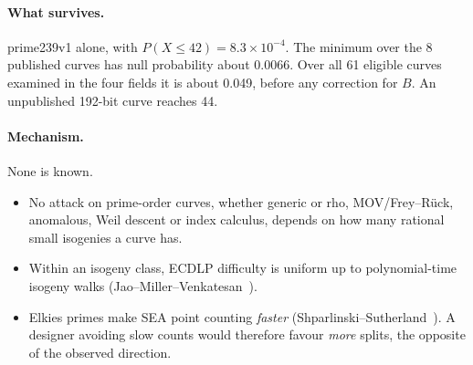 \documentclass[11pt,a4paper]{article}
\theoremstyle{plain}
\begin{document}
\paragraph{What survives.} prime239v1 alone, with
$P(X \le 42) = 8.3 \times 10^{-4}$. The minimum over the 8 published curves
has null probability about 0.0066. Over all 61 eligible curves examined in the
four fields it is about 0.049, before any correction for $B$. An unpublished
192-bit curve reaches 44.

\paragraph{Mechanism.} None is known.
\begin{itemize}
\item No attack on prime-order curves, whether generic or rho, MOV/Frey--R\"uck,
  anomalous, Weil descent or index calculus, depends on how many rational small
  isogenies a curve has.
\item Within an isogeny class, ECDLP difficulty is uniform up to
  polynomial-time isogeny walks (Jao--Miller--Venkatesan~\cite{jmv}).
\item Elkies primes make SEA point counting \emph{faster}
  (Shparlinski--Sutherland~\cite{shparlinski-sutherland}). A designer avoiding
  slow counts would therefore favour \emph{more} splits, the opposite of the
  observed direction.
\end{itemize}
\end{document}
